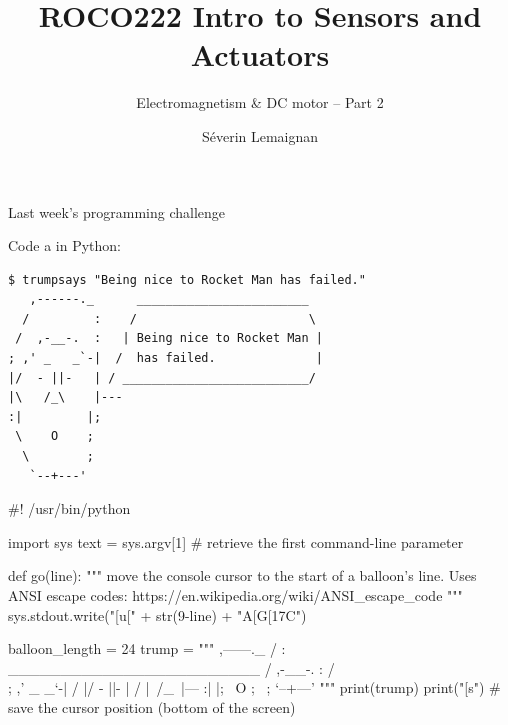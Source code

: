 \documentclass[compress]{beamer}
\title{ROCO222 \newline Intro to Sensors and Actuators}
\subtitle{Electromagnetism \& DC motor -- Part 2}
\date{}
\author{Séverin Lemaignan}
\institute{Centre for Robotics and Neural Systems\\{\bf Plymouth University}}
\makeatletter
\def\beamer@writeslidentry@miniframesoff{%
  \expandafter\beamer@ifempty\expandafter{\beamer@framestartpage}{}%
  {%
    \clearpage\beamer@notesactions%
  }
}
\newcommand*{\miniframesoff}{\let\beamer@writeslidentry=\beamer@writeslidentry@miniframesoff}
\makeatother
\begin{document}



\maketitle

\miniframesoff
\begin{frame}[fragile]{Last week's programming challenge}

Code a  in Python:

\begin{verbatim}
$ trumpsays "Being nice to Rocket Man has failed."
   ,------._      ________________________
  /         :    /                        \
 /  ,-__-.  :   | Being nice to Rocket Man |
; ,' _   _`-|  /  has failed.              |
|/  - ||-   | / __________________________/
|\   /_\    |---
:|         |;
 \    O    ;
  \        ;
   `--+---'
\end{verbatim}

\end{frame}

\begin{frame}[fragile]{}
\begin{pythoncode}
#! /usr/bin/python

import sys
text = sys.argv[1] # retrieve the first command-line parameter

def go(line):
    """ move the console cursor to the start of a balloon's line.
    Uses ANSI escape codes: https://en.wikipedia.org/wiki/ANSI_escape_code
    """
    sys.stdout.write("[u[" + str(9-line) + "A[G[17C")

balloon_length = 24
trump = """
   ,------._     
  /         :    ________________________
 /  ,-__-.  :   /                        \\  
; ,' _   _`-|  /  
|/  - ||-   | /  
|\   /_\    |---
:|         |;
 \    O    ;
  \        ;
   `--+---'
"""
print(trump)
print("[s") # save the cursor position (bottom of the screen)
\end{pythoncode}
\end{frame}
\end{document}
